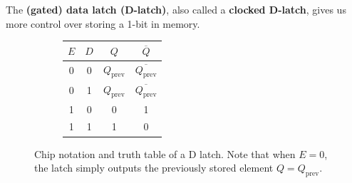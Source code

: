   \begin{definition}
    \label{def:level-triggered-d-latch}
    The \textbf{(gated) data latch (D-latch)}, also called a \textbf{clocked D-latch}, gives us more control over storing a 1-bit in memory. 

    \begin{figure}[H]
      \centering
      \begin{subfigure}[b]{0.48\textwidth}
        \centering
      \end{subfigure}
      \hfill 
      \begin{subfigure}[b]{0.48\textwidth}
        \centering
          \begin{tabular}{|c|c|c|c|}
            \hline
            $E$ & $D$ & $Q$ & $\overline{Q}$ \\
            \hline
            0 & 0 & $Q_{\mathrm{prev}}$ & $\overline{Q_{\mathrm{prev}}}$ \\
            \hline
            0 & 1 & $Q_{\mathrm{prev}}$ & $\overline{Q_{\mathrm{prev}}}$ \\
            \hline
            1 & 0 & 0 & 1 \\
            \hline
            1 & 1 & 1 & 0 \\
            \hline
          \end{tabular}
      \end{subfigure}
      \caption{Chip notation and truth table of a D latch. Note that when $E = 0$, the latch simply outputs the previously stored element $Q = Q_{\mathrm{prev}}$. }
    \end{figure}

    \begin{figure}[H]
      \centering
      \begin{subfigure}[b]{0.48\textwidth}
        \centering
\end{subfigure}
\end{figure}
\end{definition}
